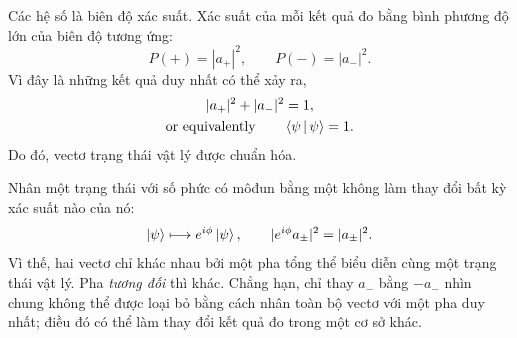Các hệ số là biên độ xác suất. Xác suất của mỗi kết quả đo bằng bình phương độ lớn của biên độ tương ứng:
\begin{equation}
  P(+)=|a_+|^2,
  \qquad
  P(-)=|a_-|^2.
  \label{eq:l02-born-rule}
\end{equation}
Vì đây là những kết quả duy nhất có thể xảy ra,
\begin{equation}
  \begin{gathered}
    |a_+|^2+|a_-|^2=1,\\
    \text{or equivalently}\qquad \left\langle\psi\,\middle|\,\psi\right\rangle=1.
  \end{gathered}
  \label{eq:l02-normalization}
\end{equation}
Do đó, vectơ trạng thái vật lý được chuẩn hóa.

\begin{classroomqa}
\end{classroomqa}

Nhân một trạng thái với số phức có môđun bằng một không làm thay đổi bất kỳ xác suất nào của nó:
\begin{equation}
  \left\lvert\psi\right\rangle\longmapsto e^{i\phi}\left\lvert\psi\right\rangle,
  \qquad
  |e^{i\phi}a_\pm|^2=|a_\pm|^2.
  \label{eq:l02-global-phase}
\end{equation}
Vì thế, hai vectơ chỉ khác nhau bởi một pha tổng thể biểu diễn cùng một trạng thái vật lý. Pha \emph{tương đối} thì khác. Chẳng hạn, chỉ thay \(a_-\) bằng \(-a_-\) nhìn chung không thể được loại bỏ bằng cách nhân toàn bộ vectơ với một pha duy nhất; điều đó có thể làm thay đổi kết quả đo trong một cơ sở khác.

\begin{classroomqa}
\end{classroomqa}

